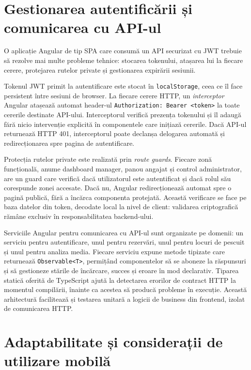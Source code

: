 \section{Gestionarea autentificării și comunicarea cu API-ul}

O aplicație Angular de tip SPA care consumă un API securizat cu JWT trebuie să rezolve mai multe probleme tehnice: stocarea tokenului, atașarea lui la fiecare cerere, protejarea rutelor private și gestionarea expirării sesiunii.

Tokenul JWT primit la autentificare este stocat în \texttt{localStorage}, ceea ce îl face persistent între sesiuni de browser. La fiecare cerere HTTP, un \emph{interceptor} Angular atașează automat header-ul \texttt{Authorization: Bearer <token>} la toate cererile destinate API-ului. Interceptorul verifică prezența tokenului și îl adaugă fără nicio intervenție explicită în componentele care inițiază cererile. Dacă API-ul returnează HTTP 401, interceptorul poate declanșa delogarea automată și redirecționarea spre pagina de autentificare.

Protecția rutelor private este realizată prin \emph{route guards}. Fiecare zonă funcțională, anume dashboard manager, panou angajat și control administrator, are un guard care verifică dacă utilizatorul este autentificat și dacă rolul său corespunde zonei accesate. Dacă nu, Angular redirecționează automat spre o pagină publică, fără a încărca componenta protejată. Această verificare se face pe baza datelor din token, decodate local la nivel de client: validarea criptografică rămâne exclusiv în responsabilitatea backend-ului.

Serviciile Angular pentru comunicarea cu API-ul sunt organizate pe domenii: un serviciu pentru autentificare, unul pentru rezervări, unul pentru locuri de pescuit și unul pentru analiza media. Fiecare serviciu expune metode tipizate care returnează \texttt{Observable<T>}, permițând componentelor să se aboneze la răspunsuri și să gestioneze stările de încărcare, succes și eroare în mod declarativ. Tiparea statică oferită de TypeScript \citep{typescript} ajută la detectarea erorilor de contract HTTP la momentul compilării, înainte ca acestea să producă probleme în execuție. Această arhitectură facilitează și testarea unitară a logicii de business din frontend, izolat de comunicarea HTTP.

\section{Adaptabilitate și considerații de utilizare mobilă}

